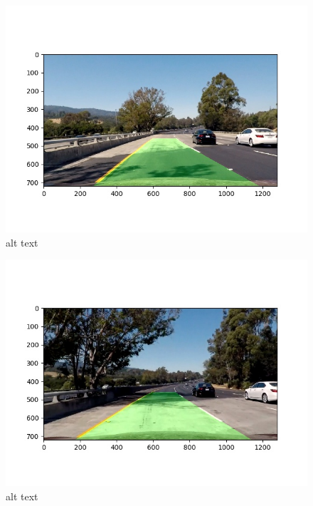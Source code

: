 \documentclass[11pt]{article}
\makeatletter
\def\maxwidth{\ifdim\Gin@nat@width>\linewidth\linewidth
    \else\Gin@nat@width\fi}
\let\Oldincludegraphics\includegraphics
\renewcommand{\includegraphics}[1]{\Oldincludegraphics[width=.8\maxwidth]{#1}}
\makeatother
\begin{document}
\begin{figure}
\centering
\includegraphics{./output_images/Warp_back/map_lane_test4.jpg}
\caption{alt text}
\end{figure}

\begin{figure}
\centering
\includegraphics{./output_images/Warp_back/map_lane_test5.jpg}
\caption{alt text}
\end{figure}
\end{document}
